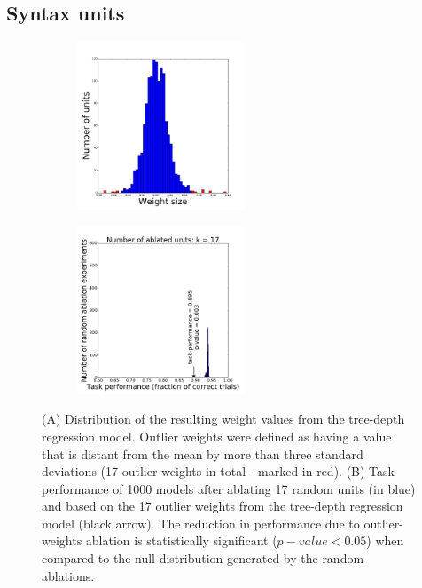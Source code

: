 \subsection{Syntax units}
\begin{figure}[t!]
    \centering
    \begin{subfigure}{0.45\textwidth}
            \centering
            \includegraphics[height=5cm]{Figures/weights_Ridge_synthetic_dist.png}
    \label{fig:fig1}
    \end{subfigure}
\begin{subfigure}{0.45\textwidth}
            \centering
            \includegraphics[height=5cm]{Figures/null_distribution_ablation_experiment_k_17.png}
    \label{fig:fig2}
    \end{subfigure}
\caption{(A) Distribution of the resulting weight values from the tree-depth regression model. Outlier weights were defined as having a value that is distant from the mean by more than three standard deviations (17 outlier weights in total - marked in red). (B) Task performance of 1000 models after ablating 17 random units (in blue) and based on the 17 outlier weights from the tree-depth regression model (black arrow). The reduction in performance due to outlier-weights ablation is statistically significant ($p-value < 0.05$) when compared to the null distribution generated by the random ablations.}
\end{figure}


